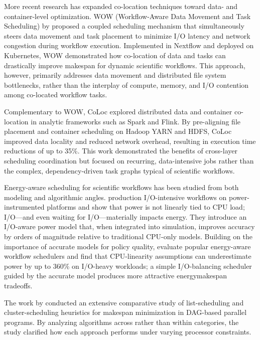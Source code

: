 More recent research has expanded co-location techniques toward data- and container-level optimization. WOW (Workflow-Aware Data Movement and Task Scheduling) by \cite{11044799} proposed a coupled scheduling mechanism that simultaneously steers data movement and task placement to minimize I/O latency and network congestion during workflow execution. Implemented in Nextflow and deployed on Kubernetes, WOW demonstrated how co-location of data and tasks can drastically improve makespan for dynamic scientific workflows. This approach, however, primarily addresses data movement and distributed file system bottlenecks, rather than the interplay of compute, memory, and I/O contention among co-located workflow tasks.

Complementary to WOW, CoLoc \cite{7840954} explored distributed data and container co-location in analytic frameworks such as Spark and Flink. By pre-aligning file placement and container scheduling on Hadoop YARN and HDFS, CoLoc improved data locality and reduced network overhead, resulting in execution time reductions of up to 35\%. This work demonstrated the benefits of cross-layer scheduling coordination but focused on recurring, data-intensive jobs rather than the complex, dependency-driven task graphs typical of scientific workflows.

Energy-aware scheduling for scientific workflows has been studied from both modeling and algorithmic angles. \cite{Ferreira_da_Silva_2020} production I/O-intensive workflows on power-instrumented platforms and show that power is not linearly tied to CPU load; I/O—and even waiting for I/O—materially impacts energy. They introduce an I/O-aware power model that, when integrated into simulation, improves accuracy by orders of magnitude relative to traditional CPU-only models. Building on the importance of accurate models for policy quality, \cite{Coleman_2021}evaluate popular energy-aware workflow schedulers and find that CPU-linearity assumptions can underestimate power by up to 360\% on I/O-heavy workloads; a simple I/O-balancing scheduler guided by the accurate model produces more attractive energymakespan tradeoffs.


The work by \cite{8301529} conducted an extensive comparative study of list-scheduling and cluster-scheduling heuristics for makespan minimization in DAG-based parallel programs. By analyzing algorithms across rather than within categories, the study clarified how each approach performs under varying processor constraints.

